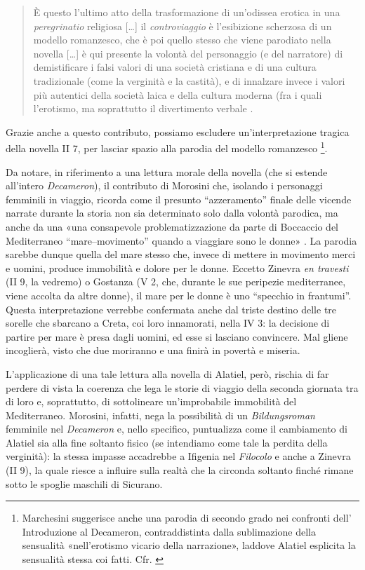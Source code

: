 \begin{quote}
È questo l'ultimo atto della trasformazione di un'odissea erotica in una
\emph{peregrinatio} religiosa {[}\ldots{}{]} il \emph{controviaggio} è
l'esibizione scherzosa di un modello romanzesco, che è poi quello stesso
che viene parodiato nella novella {[}\ldots{}{]} è qui presente la
volontà del personaggio (e del narratore) di demistificare i falsi
valori di una società cristiana e di una cultura tradizionale (come la
verginità e la castità), e di innalzare invece i valori più autentici
della società laica e della cultura moderna (fra i quali l'erotismo, ma
soprattutto il divertimento verbale \autocite[p.~152]{picone2008}.
\end{quote}

Grazie anche a questo contributo, possiamo escludere un'interpretazione
tragica della novella II 7, per lasciar spazio alla parodia del modello
romanzesco \footnote{Marchesini suggerisce anche una parodia di secondo
  grado nei confronti dell' Introduzione al Decameron, contraddistinta
  dalla sublimazione della sensualità «nell'erotismo vicario della
  narrazione», laddove Alatiel esplicita la sensualità stessa coi fatti.
  Cfr. \autocite[p.~266]{marchesini1994}}.

Da notare, in riferimento a una lettura morale della novella (che si
estende all'intero \emph{Decameron}), il contributo di Morosini che,
isolando i personaggi femminili in viaggio, ricorda come il presunto
``azzeramento'' finale delle vicende narrate durante la storia non sia
determinato solo dalla volontà parodica, ma anche da una «una
consapevole problematizzazione da parte di Boccaccio del Mediterraneo
``mare--movimento'' quando a viaggiare sono le donne»
\autocite[p.~11]{morosini2010p}. La parodia sarebbe dunque quella del
mare stesso che, invece di mettere in movimento merci e uomini, produce
immobilità e dolore per le donne. Eccetto Zinevra \emph{en travesti} (II
9, la vedremo) o Gostanza (V 2, che, durante le sue peripezie
mediterranee, viene accolta da altre donne), il mare per le donne è uno
``specchio in frantumi''. Questa interpretazione verrebbe confermata
anche dal triste destino delle tre sorelle che sbarcano a Creta, coi
loro innamorati, nella IV 3: la decisione di partire per mare è presa
dagli uomini, ed esse si lasciano convincere. Mal gliene incoglierà,
visto che due moriranno e una finirà in povertà e miseria.

L'applicazione di una tale lettura alla novella di Alatiel, però,
rischia di far perdere di vista la coerenza che lega le storie di
viaggio della seconda giornata tra di loro e, soprattutto, di
sottolineare un'improbabile immobilità del Mediterraneo. Morosini,
infatti, nega la possibilità di un \emph{Bildungsroman} femminile nel
\emph{Decameron} e, nello specifico, puntualizza come il cambiamento di
Alatiel sia alla fine soltanto fisico (se intendiamo come tale la
perdita della verginità): la stessa impasse accadrebbe a Ifigenia nel
\emph{Filocolo} e anche a Zinevra (II 9), la quale riesce a influire
sulla realtà che la circonda soltanto finché rimane sotto le spoglie
maschili di Sicurano.

